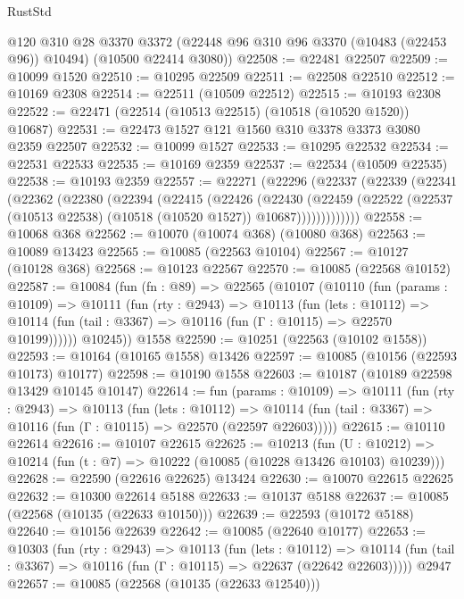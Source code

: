 \begin{lexlean}{RustStd}
\begin{coremodule}
      @120
      @310
      @28
      @3370
      @3372
      (@22448 @96 @310 @96 @3370 (@10483 (@22453 @96)) @10494)
      (@10500 @22414 @3080))
@22508 := @22481 @22507
@22509 := @10099 @1520
@22510 := @10295 @22509
@22511 := @22508 @22510
@22512 := @10169 @2308
@22514 := @22511 (@10509 @22512)
@22515 := @10193 @2308
@22522 := @22471 (@22514 (@10513 @22515) (@10518 (@10520 @1520)) @10687)
@22531 := @22473 @1527 @121 @1560 @310 @3378 @3373 @3080 @2359 @22507
@22532 := @10099 @1527
@22533 := @10295 @22532
@22534 := @22531 @22533
@22535 := @10169 @2359
@22537 := @22534 (@10509 @22535)
@22538 := @10193 @2359
@22557 := @22271
    (@22296
      (@22337
        (@22339
          (@22341
            (@22362
              (@22380
                (@22394
                  (@22415
                    (@22426
                      (@22430
                        (@22459
                          (@22522
                            (@22537 (@10513 @22538) (@10518 (@10520 @1527)) @10687)))))))))))))
@22558 := @10068 @368
@22562 := @10070 (@10074 @368) (@10080 @368)
@22563 := @10089 @13423
@22565 := @10085 (@22563 @10104)
@22567 := @10127 (@10128 @368)
@22568 := @10123 @22567
@22570 := @10085 (@22568 @10152)
@22587 := @10084
    (fun (fn : @89) =>
    @22565
      (@10107
        (@10110
          (fun (params : @10109) =>
          @10111
            (fun (rty : @2943) =>
            @10113
              (fun (lets : @10112) =>
              @10114 (fun (tail : @3367) => @10116 (fun (Γ : @10115) => @22570 @10199))))))
        @10245))
    @1558
@22590 := @10251 (@22563 (@10102 @1558))
@22593 := @10164 (@10165 @1558) @13426
@22597 := @10085 (@10156 (@22593 @10173) @10177)
@22598 := @10190 @1558
@22603 := @10187 (@10189 @22598 @13429 @10145 @10147)
@22614 := fun (params : @10109) =>
  @10111
    (fun (rty : @2943) =>
    @10113
      (fun (lets : @10112) =>
      @10114 (fun (tail : @3367) => @10116 (fun (Γ : @10115) => @22570 (@22597 @22603)))))
@22615 := @10110 @22614
@22616 := @10107 @22615
@22625 := @10213
    (fun (U : @10212) => @10214 (fun (t : @7) => @10222 (@10085 (@10228 @13426 @10103) @10239)))
@22628 := @22590 (@22616 @22625) @13424
@22630 := @10070 @22615 @22625
@22632 := @10300 @22614 @5188
@22633 := @10137 @5188
@22637 := @10085 (@22568 (@10135 (@22633 @10150)))
@22639 := @22593 (@10172 @5188)
@22640 := @10156 @22639
@22642 := @10085 (@22640 @10177)
@22653 := @10303
    (fun (rty : @2943) =>
    @10113
      (fun (lets : @10112) =>
      @10114 (fun (tail : @3367) => @10116 (fun (Γ : @10115) => @22637 (@22642 @22603)))))
    @2947
@22657 := @10085 (@22568 (@10135 (@22633 @12540)))

\end{coremodule}
\end{lexlean}
